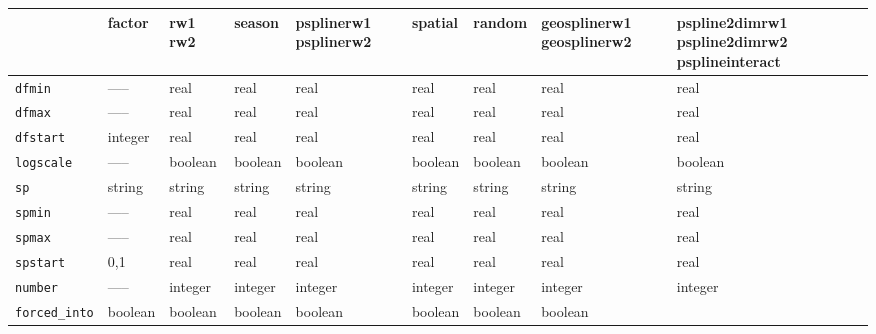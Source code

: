 \begin{sidewaystable} \footnotesize
\begin{tabular}{|l||p{1.5cm}|p{1.5cm}|p{1.5cm}|p{1.5cm}|p{2cm}|p{1.5cm}|p{2cm}|p{2.5cm}|}

\hline
                     & factor & rw1 \newline rw2 & season & psplinerw1 \newline psplinerw2 & spatial & random & geosplinerw1 \newline geosplinerw2
                     & pspline2dimrw1 \newline pspline2dimrw2 \newline psplineinteract \\
\hline\hline
 {\tt dfmin}        & -----   & real             & real   & real                           & real    & real   & real
                    & real \\
\hline
 {\tt dfmax}        & -----   & real             & real   & real                           & real    & real   & real
                    & real \\
\hline
 {\tt dfstart}      & integer & real             & real   & real                           & real    & real   & real
                    & real \\
\hline
 {\tt logscale}     & -----   & boolean          & boolean & boolean                       & boolean & boolean & boolean
                    & boolean \\
\hline
 {\tt sp}           & string & string          & string & string                       & string & string  & string
                    & string \\
\hline
 {\tt spmin}        & -----   & real             & real   & real                           & real    & real   & real
                    & real \\
\hline
 {\tt spmax}        & -----   & real             & real   & real                           & real    & real   & real
                    & real \\
\hline
 {\tt spstart}      & 0,1 & real             & real   & real                           & real    & real   & real
                    & real \\
\hline
 {\tt number}       & -----   & integer          & integer & integer                       & integer & integer & integer
                    & integer \\
\hline
 {\tt forced\_into} & boolean & boolean          & boolean & boolean                       & boolean & boolean & boolean

\end{tabular}
\end{sidewaystable}

